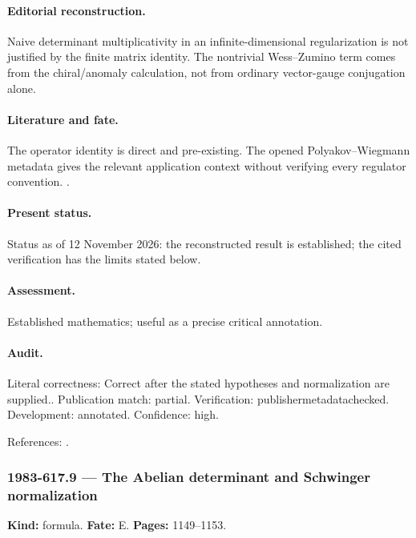 \paragraph{Editorial reconstruction.} Naive determinant multiplicativity in an infinite-dimensional regularization is not justified by the finite matrix identity. The nontrivial Wess--Zumino term comes from the chiral/anomaly calculation, not from ordinary vector-gauge conjugation alone.

\paragraph{Literature and fate.} The operator identity is direct and pre-existing. The opened Polyakov--Wiegmann metadata gives the relevant application context without verifying every regulator convention. \citep{polyakovwiegmann1984multivalued}.

\paragraph{Present status.} Status as of 12 November 2026: the reconstructed result is established; the cited verification has the limits stated below.

\paragraph{Assessment.} Established mathematics; useful as a precise critical annotation.

\paragraph{Audit.} Literal correctness: Correct after the stated hypotheses and normalization are supplied.. Publication match: partial. Verification: publishermetadatachecked. Development: annotated. Confidence: high.

\noindent References: \citep{polyakovwiegmann1984multivalued}.\par

\subsubsection{1983-617.9 --- The Abelian determinant and Schwinger normalization}

\label{item:1983-617.9}

\noindent\textbf{Kind:} formula. \textbf{Fate:} E. \textbf{Pages:} 1149--1153.\par

